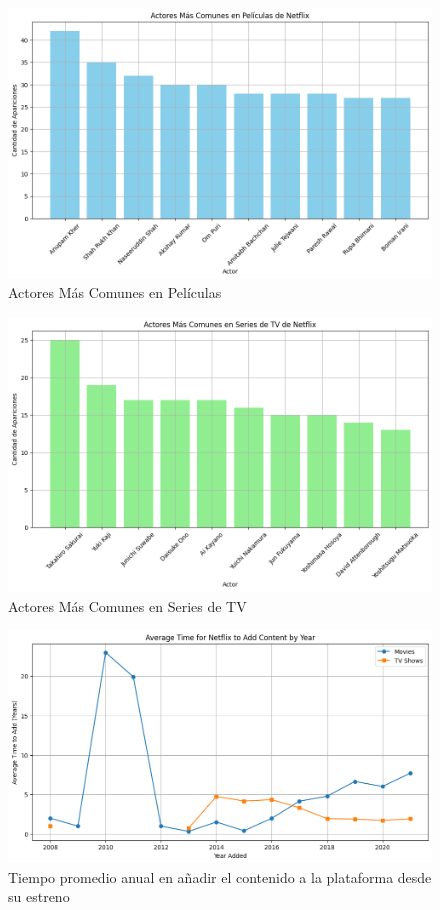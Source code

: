 \documentclass{article}
\begin{document}
\begin{figure}[H]
    \centering
    \includegraphics[width=\textwidth]{Graphs/actores_comunes_peliculas.png}
    \caption{Actores Más Comunes en Películas}
    \label{fig:actores_peliculas}
\end{figure}

\begin{figure}[H]
    \centering
    \includegraphics[width=\textwidth]{Graphs/actores_comunes_series.png}
    \caption{Actores Más Comunes en Series de TV}
    \label{fig:actores_series}
\end{figure}

\begin{figure}[H]
    \centering
    \includegraphics[width=\textwidth]{Graphs/rapidez_adicion.png}
    \caption{Tiempo promedio anual en añadir el contenido a la plataforma desde su estreno }
    \label{fig:rapidez_subida}
\end{figure}
\end{document}
